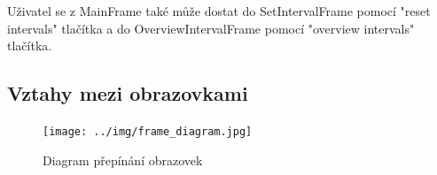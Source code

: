 Uživatel se z MainFrame také může dostat do SetIntervalFrame pomocí "reset intervals" tlačítka a do
OverviewIntervalFrame pomocí "overview intervals" tlačítka.

\subsection{Vztahy mezi obrazovkami}

\begin{figure}[p]\centering
\texttt{[image: ../img/frame\_diagram.jpg]}
\caption{Diagram přepínání obrazovek}
\label{frame-diagram}
\end{figure}

